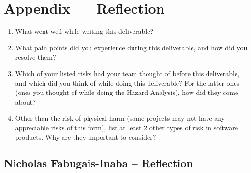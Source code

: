 \documentclass{article}
\begin{document}
\newpage{}

\section*{Appendix --- Reflection}



\begin{enumerate}
    \item What went well while writing this deliverable? 
    \item What pain points did you experience during this deliverable, and how
    did you resolve them?
    \item Which of your listed risks had your team thought of before this
    deliverable, and which did you think of while doing this deliverable? For
    the latter ones (ones you thought of while doing the Hazard Analysis), how
    did they come about?
    \item Other than the risk of physical harm (some projects may not have any
    appreciable risks of this form), list at least 2 other types of risk in
    software products. Why are they important to consider?
\end{enumerate}

\subsection*{Nicholas Fabugais-Inaba -- Reflection}
\end{document}
